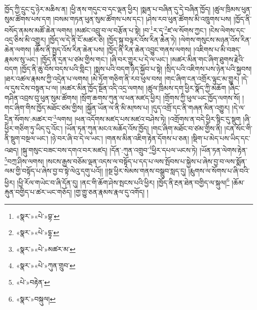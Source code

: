 ཁྱོད་ཀྱི་དྲུང་དུ་ཉེར་མཆིས་ན། །ཕྱི་ནས་གདུང་བ་དང་ལྡན་ཕྱིར། །སྨན་པ་བཞིན་དུ་དེ་བཞིན་ཁྱོད། །ཚུལ་ཁྲིམས་ཕུན་སུམ་ཚོགས་པས་དག །བསམ་གཏན་ཕུན་སུམ་ཚོགས་པས་དང་། །ཤེས་རབ་ཕུན་ཚོགས་མི་འཁྲུགས་པས། །ཁྱོད་ནི་བསོད་ནམས་མཚོ་ཆེན་ལགས། །མཚང་འབྲུ་བ་ལ་བརྩོན་པ་སྟེ། །བ་\footnote{«སྣར་»«པེ་»བྷ་}ར་དྭ་\footnote{«སྣར་»«པེ་»དྷྭ་}ཛ་ལ་སོགས་ཀྱང་། །ངེས་ལེགས་དང་འདྲ་ཅིས་མི་འགྱུར། །ཁྱོད་ལ་དེ་ནི་ངོ་མཚར་ཅི། །ཁྱོད་སྐུ་བལྟར་འོས་རིན་ཆེན་ཏེ། །ལེགས་གསུངས་མཉན་འོས་རིན་ཆེན་ལགས། །ཆོས་ནི་སྤྱད་འོས་རིན་ཆེན་པས། །ཁྱོད་ནི་རིན་ཆེན་འབྱུང་གནས་ལགས། །འཇིགས་པ་མི་བཟད་རྣམས་སུ་ཡང་། །ཁྱོད་ནི་དྲན་པ་ཙམ་གྱིས་གང་། །ཞི་བར་གྱུར་པ་དེ་ལ་ཡང་། །མཚར་མིན་གང་ཞིག་ཐུགས་རྗེའི་བདག །ཁྱོད་ནི་ཆུ་བོས་བདས་པའི་གླིང་། །སྨས་པའི་བདག་ཉིད་སྐྱོབ་པ་སྟེ། །སྲིད་པའི་འཇིགས་པས་ཉེན་པའི་སྐྱབས། །ཐར་འཚལ་རྣམས་ཀྱི་འདྲེན་པ་ལགས། །མེ་ཏོག་གཅིག་ནི་རབ་ཕུལ་བས། །གང་ཞིག་ངན་འགྲོར་ལྟུང་མ་གྱུར། །དེ་ལ་དུས་ངེས་བསྟན་པ་ལ། །མཚར་མིན་ཁྱོད་སྔོན་འདི་འདྲ་ལགས། །ཚུལ་ཁྲིམས་དག་ཕྱིར་སྣོད་ཀྱི་མཆོག །ཞིང་གཤིན་འབྲས་བུ་ཕུན་སུམ་ཚོགས། །སྲོག་ཆགས་ཀུན་ལ་ཕན་མཛད་ཕྱིར། །གྲོགས་ཀྱི་ཕུལ་ཡང་ཁྱོད་ལགས་སོ། །གང་ཞིག་གིས་ཁྱོད་མཐོང་ཙམ་གྱིས། །སྐྱོན་ཡོན་ལ་ནི་མི་མཁས་པ། །དུད་འགྲོ་དང་ནི་གཞན་མིན་འགྱུར། །དེ་ལ་དྲིན་སོགས་:མཚར་བ་\footnote{«སྣར་»«པེ་»མཚར་མ་}ལགས། །ཕན་འདོགས་མཛད་པས་མཛའ་བཤེས་ཏེ། །འགྲོགས་ན་བདེ་ཕྱིར་སྙིང་དུ་སྡུག །ཞི་ཕྱིར་གཅིག་ཏུ་ཡིད་དུ་འོང་། །ཡོན་ཏན་ཀུན་མངའ་མཆོད་འོས་ཁྱོད། །གང་ཞིག་མཐོང་བ་ཙམ་གྱིས་ནི། །ངན་སོང་གི་ནི་སྡུག་བསྔལ་ཡང་། །ཉེ་བར་ཞི་བ་དེ་ལ་ཡང་། །གནས་མིན་འཇིག་རྟེན་དོགས་པ་ཅན། །སྡིག་པ་མེད་པས་ཡིད་དང་འཐད། །སྐུ་གསུང་བཟང་བས་དགའ་བར་མཛད། །དོན་:ཀུན་འགྲུབ་\footnote{«སྣར་»«པེ་»ཀུན་གྲུབ་}ཕྱིར་དཔལ་ཡངས་ཏེ། །ཡོན་ཏན་ལེགས་རྟེན་\footnote{«པེ་»བརྟེན་}བཀྲ་ཤིས་ལགས། །སངས་རྒྱས་བཅོམ་ལྡན་འདས་ལ་བསྟོད་པ་དད་པ་ལས་སྤོབས་པ་སྐྱེས་པ་ཞེས་བྱ་བ་ལས་སྨོན་ལམ་གྱི་བསྟོད་པ་ཞེས་བྱ་བ་སྟེ་ལེའུ་དགུ་པའོ།། །།སྔ་ཕྱིར་སེམས་གནས་བསྒྲུབ་སླད་དུ། །རྨུགས་ལ་སོགས་པ་ཞི་བའི་ཕྱིར། །ཕྱི་རོལ་གཡེང་བ་ཞི་དོན་དུ། །ནང་གི་ཆོག་ཤེས་སྤངས་པའི་ཕྱིར། །ཁྱོད་ནི་རྔན་ཐེན་བགྱིད་ལ་སྐུལ།\footnote{«སྣར་»བསྐུལ།} །ཆོམ་རྐུན་བགྱིད་པ་ཚར་ཡང་གཅོད། །གྱ་གྱུ་ཅན་རྣམས་རྣལ་དུ་འགོད། །
